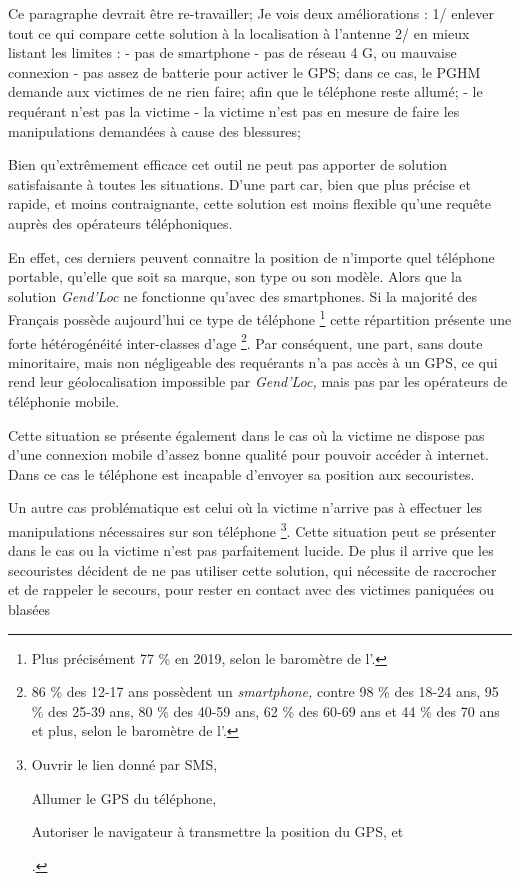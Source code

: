 Ce paragraphe devrait être re-travailler; Je vois deux améliorations :
1/ enlever tout ce qui compare cette solution à la localisation à
l'antenne 2/ en mieux listant les limites : - pas de smartphone - pas
de réseau 4 G, ou mauvaise connexion - pas assez de batterie pour
activer le GPS; dans ce cas, le PGHM demande aux victimes de ne rien
faire; afin que le téléphone reste allumé; - le requérant n'est pas la
victime - la victime n'est pas en mesure de faire les manipulations
demandées à cause des blessures;

Bien qu’extrêmement efficace cet outil ne peut pas apporter de
solution satisfaisante à toutes les situations. D'une part car, bien
que plus précise et rapide, et moins contraignante, cette solution est
moins flexible qu'une requête auprès des opérateurs téléphoniques.

En effet, ces derniers peuvent connaitre la position de n'importe quel
téléphone portable, qu'elle que soit sa marque, son type ou son
modèle. Alors que la solution \emph{Gend'Loc} ne fonctionne qu'avec
des smartphones. Si la majorité des Français possède aujourd'hui ce
type de téléphone \footnote{Plus précisément 77 \% en 2019, selon le
  baromètre de l'\textcite{ARCEP2019}.} cette répartition présente une
forte hétérogénéité inter-classes d'age \footnote{86 \% des 12-17 ans
  possèdent un \emph{smartphone,} contre 98 \% des 18-24 ans, 95 \%
  des 25-39 ans, 80 \% des 40-59 ans, 62 \% des 60-69 ans et 44 \% des
  70 ans et plus, selon le baromètre de l'\textcite{ARCEP2019}.}. Par
conséquent, une part, sans doute minoritaire, mais non négligeable des
requérants n'a pas accès à un GPS, ce qui rend leur géolocalisation
impossible par \emph{Gend'Loc,} mais pas par les opérateurs de
téléphonie mobile.

Cette situation se présente également dans le cas où la victime ne
dispose pas d'une connexion mobile d'assez bonne qualité pour pouvoir
accéder à internet. Dans ce cas le téléphone est incapable d'envoyer
sa position aux secouristes.

Un autre cas problématique est celui où la victime n'arrive pas à
effectuer les manipulations nécessaires sur son téléphone \footnote{%
  \begin{enumerate*}[label=(\alpha*)]
  \item Ouvrir le lien donné par SMS,
  \item Allumer le GPS du téléphone,
  \item Autoriser le navigateur à transmettre la position du GPS, et
  \item     
  \end{enumerate*}.}. Cette
situation peut se présenter dans le cas ou la victime n'est pas
parfaitement lucide. De plus il arrive que les secouristes décident de
ne pas utiliser cette solution, qui nécessite de raccrocher et de
rappeler le secours, pour rester en contact avec des victimes
paniquées ou blasées

